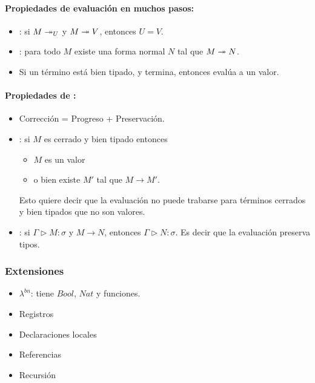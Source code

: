 \paragraph{Propiedades de evaluación en muchos pasos:}

\begin{itemize}
  \item {}: si $M \twoheadrightarrow _U$ y $M \twoheadrightarrow V$, entonces $U=V$.
  \item {}: para todo $M$ existe una forma normal $N$ tal que $M \twoheadrightarrow N$.
  \item Si un término está bien tipado, y termina, entonces evalúa a un valor.
\end{itemize}

\paragraph{Propiedades de :}

\begin{itemize}
  \item Corrección = Progreso + Preservación.
  \item {}: si $M$ es cerrado y bien tipado entonces
    \begin{itemize}
      \item $M$ es un valor
      \item o bien existe $M'$ tal que $M \to M'$.
    \end{itemize}
    Esto quiere decir que la evaluación no puede trabarse para términos cerrados y bien tipados que no son valores.
  \item {}: si $\Gamma \rhd M : \sigma$ y $M \to N$, entonces $\Gamma \rhd N : \sigma$. Es decir que la evaluación preserva tipos.
\end{itemize}

\subsubsection{Extensiones}

\begin{itemize}
  \item $\lambda^{bn}$: tiene $Bool$, $Nat$ y funciones.
  \item Registros
  \item Declaraciones locales
  \item Referencias
  \item Recursión
\end{itemize}

